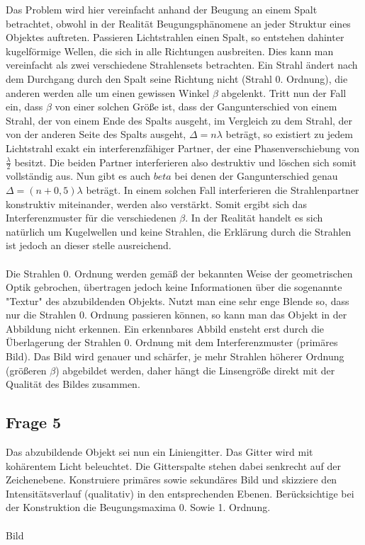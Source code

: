 \documentclass[a4paper,10pt]{scrartcl}
\begin{document}
			Das Problem wird hier vereinfacht anhand der Beugung an einem Spalt betrachtet, obwohl in der Realität Beugungsphänomene an jeder Struktur eines Objektes auftreten. Passieren Lichtstrahlen einen Spalt, so entstehen dahinter kugelförmige Wellen, die sich in alle Richtungen ausbreiten. Dies kann man vereinfacht als zwei verschiedene Strahlensets betrachten. Ein Strahl ändert nach dem Durchgang durch den Spalt seine Richtung nicht (Strahl 0. Ordnung), die anderen werden alle um einen gewissen Winkel \(\beta\) abgelenkt. Tritt nun der Fall ein, dass \(\beta\) von einer solchen Größe ist, dass der Gangunterschied von einem Strahl, der von einem Ende des Spalts ausgeht, im Vergleich zu dem Strahl, der von der anderen Seite des Spalts ausgeht, \(\Delta=n\lambda\) beträgt, so existiert zu jedem Lichtstrahl exakt ein interferenzfähiger Partner, der eine Phasenverschiebung von \(\frac{\lambda}{2}\) besitzt. Die beiden Partner interferieren also destruktiv und löschen sich somit vollständig aus. Nun gibt es auch \(beta\) bei denen der Gangunterschied genau \(\Delta=(n+0,5)\lambda\) beträgt. In einem solchen Fall interferieren die Strahlenpartner konstruktiv miteinander, werden also verstärkt. Somit ergibt sich das Interferenzmuster für die verschiedenen \(\beta\). In der Realität handelt es sich natürlich um Kugelwellen und keine Strahlen, die Erklärung durch die Strahlen ist jedoch an dieser stelle ausreichend.\\
			\\
			Die Strahlen 0. Ordnung werden gemäß der bekannten Weise der geometrischen Optik gebrochen, übertragen jedoch keine Informationen über die sogenannte "Textur" des abzubildenden Objekts. Nutzt man eine sehr enge Blende so, dass nur die Strahlen 0. Ordnung passieren können, so kann man das Objekt in der Abbildung nicht erkennen. Ein erkennbares Abbild ensteht erst durch die Überlagerung der Strahlen 0. Ordnung mit dem Interferenzmuster (primäres Bild). Das Bild wird genauer und schärfer, je mehr Strahlen höherer Ordnung 
			(größeren \(\beta\)) abgebildet werden, daher hängt die Linsengröße direkt mit der Qualität des Bildes zusammen.
			
			\subsection{Frage 5}
		Das abzubildende Objekt sei nun ein Liniengitter. Das Gitter wird mit kohärentem Licht beleuchtet. Die Gitterspalte stehen dabei senkrecht auf der Zeichenebene. Konstruiere primäres sowie sekundäres Bild und skizziere den Intensitätsverlauf (qualitativ) in den entsprechenden Ebenen. Berücksichtige bei der Konstruktion die Beugungsmaxima 0. Sowie 1. Ordnung.
		\\
		\\
		Bild
		\\
		\\
\end{document}
